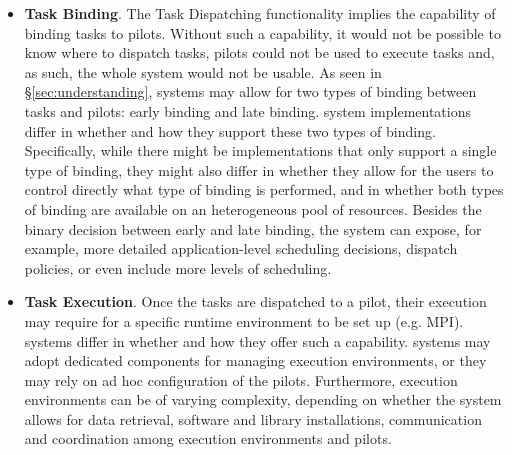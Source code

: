 \documentclass{sig-alternate}
\begin{document}
\begin{itemize}





\item \textbf{Task Binding}. The Task Dispatching functionality implies the
  capability of binding tasks to pilots. Without such a capability, it would not
  be possible to know where to dispatch tasks, pilots could not be used to
  execute tasks and, as such, the whole \pilot system would not be usable. As
  seen in \S\ref{sec:understanding}, \pilot systems may allow for two types of
  binding between tasks and pilots: early binding and late binding. \pilot
  system implementations differ in whether and how they support these two types
  of binding. Specifically, while there might be implementations that only
  support a single type of binding, they might also differ in whether they allow
  for the users to control directly what type of binding is performed, and in
  whether both types of binding are available on an heterogeneous pool of
  resources. Besides the binary decision between early and late binding, the
  \pilot system can expose, for example, more detailed application-level
  scheduling decisions, dispatch policies, or even include more levels of
  scheduling. 

\item \textbf{Task Execution}. Once the tasks are dispatched to a pilot, their
  execution may require for a specific runtime environment to be set up (e.g.
  MPI). \pilot systems differ in whether and how they offer such a capability.
  \pilot systems may adopt dedicated components for managing execution
  environments, or they may rely on ad hoc configuration of the pilots.
  Furthermore, execution environments can be of varying complexity, depending on
  whether the \pilot system allows for data retrieval, software and library
  installations, communication and coordination among execution environments and
  pilots.


\end{itemize}
\end{document}
